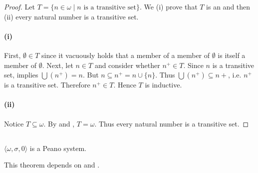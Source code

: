 \documentclass{report}
\begin{document}
\begin{proof}

  Let $T = \{n \in \omega \mid n \text{ is a transitive set}\}$.
  We (i) prove that $T$ is an  and then (ii) every
    natural number is a transitive set.

  \paragraph{(i)}%

    First, $\emptyset \in T$ since it vacuously holds that a member of a
      member of $\emptyset$ is itself a member of $\emptyset$.
    Next, let $n \in T$ and consider whether $n^+ \in T$.
    Since $n$ is a transitive set,  implies
      $\bigcup \left(n^+\right) = n$.
    But $n \subseteq n^+ = n \cup \{n\}$.
    Thus $\bigcup \left(n^+\right) \subseteq n+$, i.e. $n^+$ is a transitive
      set.
    Therefore $n^+ \in T$.
    Hence $T$ is inductive.

  \paragraph{(ii)}%

    Notice $T \subseteq \omega$.
    By  and , $T = \omega$.
    Thus every natural number is a transitive set.

\end{proof}

\subsection{}%

\begin{theorem}[4D]

  $\langle \omega, \sigma, 0 \rangle$ is a Peano system.

\end{theorem}

\begin{note}
  This theorem depends on  and .
\end{note}
\end{document}
